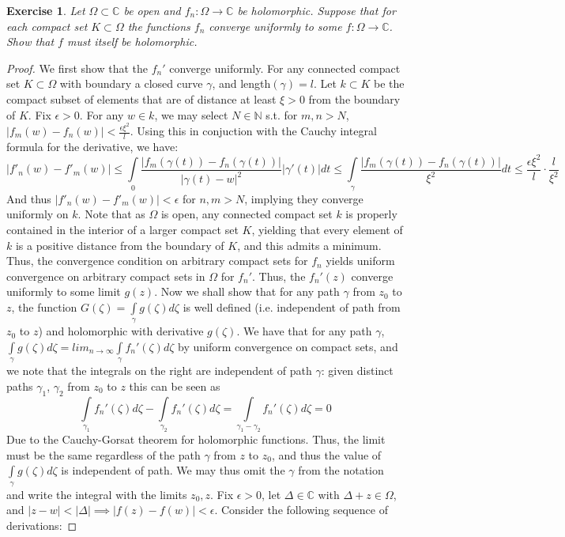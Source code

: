 \documentclass{article}
\newcommand{\bb}[1]{\mathbb{#1}}
\newtheorem{exercise}{Exercise}
\begin{document}
\begin{exercise}
  Let $\Omega \subset \bb{C}$ be open and $f_{n}: \Omega \to \bb{C}$ be holomorphic. Suppose that for each compact set $K \subset \Omega$ the functions $f_{n}$ converge uniformly to some $f: \Omega \to \bb{C}$. Show that $f$ must itself be holomorphic.  
\end{exercise}
\begin{proof}
We first show that the $f_{n}'$ converge uniformly. For any connected compact set $K \subset \Omega$ with boundary a closed curve $\gamma$, and length$(\gamma) = l$. Let $k \subset K$ be the compact subset of elements that are of distance at least $\xi > 0$ from the boundary of $K$. Fix $\epsilon > 0$. For any $w \in k$, we may select $N \in \bb{N}$ s.t. for $m,n > N$, $|f_{m}(w) - f_{n}(w)| < \frac{\epsilon \xi^{2}}{l}$. Using this in conjuction with the Cauchy integral formula for the derivative, we have:
  \[
    |f'_{n}(w) - f'_{m}(w)| \leq \int\limits_{0} \frac{|f_{m}(\gamma(t)) - f_{n}(\gamma(t))|}{|\gamma(t)-w|^{2}}  |\gamma'(t)| dt\leq \int\limits_{\gamma} \frac{|f_{m}(\gamma(t)) - f_{n}(\gamma(t))|}{\xi^{2}} dt \leq \frac{\epsilon \xi^{2}}{l}\cdot \frac{l}{\xi^{2}}
  \]
  And thus $|f'_{n}(w) - f'_{m}(w)| < \epsilon$ for $n,m > N$, implying they converge uniformly on $k$. Note that as $\Omega$ is open, any connected compact set $k$ is properly contained in the interior of a larger compact set $K$, yielding that every element of $k$ is a positive distance from the boundary of $K$, and this admits a minimum. Thus, the convergence condition on arbitrary compact sets for $f_{n}$ yields uniform convergence on arbitrary compact sets in $\Omega$ for $f_{n}'$. Thus, the $f_{n}'(z)$ converge uniformly to some limit $g(z)$. Now we shall show that for any path $\gamma$ from $z_{0}$ to $z$, the function $G(\zeta) = \int\limits_{\gamma}g(\zeta)d\zeta$ is well defined (i.e. independent of path from $z_{0}$ to $z$) and holomorphic with derivative $g(\zeta)$. We have that for any path $\gamma$, $\int\limits_{\gamma}g(\zeta)d\zeta = lim_{n\to \infty}\int\limits_{\gamma}f_{n}'(\zeta)d\zeta$ by uniform convergence on compact sets, and we note that the integrals on the right are independent of path $\gamma$: given distinct paths $\gamma_{1}$, $\gamma_{2}$ from $z_{0}$ to $z$ this can be seen as
  \[
    \int\limits_{\gamma_{1}}f_{n}'(\zeta)d\zeta - \int\limits_{\gamma_{2}}f_{n}'(\zeta)d\zeta = \int\limits_{\gamma_{1}-\gamma_{2}}f_{n}'(\zeta)d\zeta = 0
  \]
  Due to the Cauchy-Gorsat theorem for holomorphic functions. Thus, the limit must be the same regardless of the path $\gamma$ from $z$ to $z_{0}$, and thus the value of $\int\limits_{\gamma}g(\zeta)d\zeta$ is independent of path. We may thus omit the $\gamma$ from the notation and write the integral with the limits $z_{0}, z$. Fix $\epsilon>0$, let $\Delta \in \bb{C}$ with $\Delta + z \in \Omega$, and $|z - w| < |\Delta| \implies |f(z) - f(w)| < \epsilon$. Consider the following sequence of derivations:

\end{proof}
\end{document}
